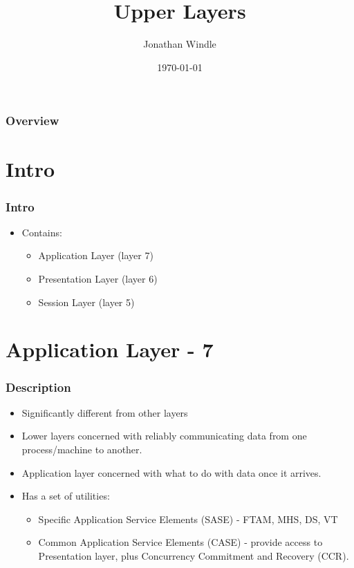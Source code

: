 \documentclass{beamer}
\title[Upper Layers]{Upper Layers} %
\author{Jonathan Windle} %
\institute[UEA] %
{
University of East Anglia \\ %
\medskip
\textit{J.Windle@uea.ac.uk} %
}
\date{\today} %
\begin{document}
\begin{frame}
\titlepage %
\end{frame}

\begin{frame}[allowframebreaks]
\frametitle{Overview} %
\tableofcontents %
\end{frame}

\section{Intro}
\begin{frame}
\frametitle{Intro}
\begin{itemize}
\item Contains:
\begin{itemize}
\item Application Layer (layer 7)
\item Presentation Layer (layer 6)
\item Session Layer (layer 5)
\end{itemize}
\end{itemize}
\end{frame}
\section{Application Layer - 7}
\begin{frame}
\frametitle{Description}
\begin{itemize}
\item Significantly different from other layers
\item Lower layers concerned with reliably communicating data from one process/machine to another.
\item Application layer concerned with what to do with data once it arrives.
\item Has a set of utilities:
\begin{itemize}
\item {\color{red} Specific Application Service Elements (SASE)} - FTAM, MHS, DS, VT
\item {\color{green} Common Application Service Elements (CASE)} - provide access to Presentation layer, plus {\color{purple}Concurrency Commitment and Recovery (CCR)}.
\end{itemize}
\end{itemize}
\end{frame}
\end{document}

